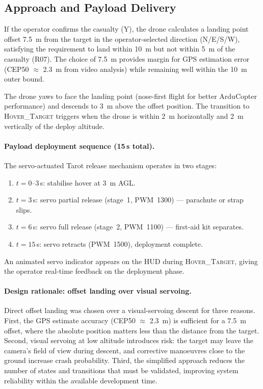 \subsection{Approach and Payload Delivery}\label{sec:mf-landing}

If the operator confirms the casualty (Y), the drone calculates a landing point offset \SI{7.5}{\metre} from the target in the operator-selected direction (N/E/S/W), satisfying the requirement to land within \SI{10}{\metre} but not within \SI{5}{\metre} of the casualty (R07).  The choice of \SI{7.5}{\metre} provides margin for GPS estimation error (CEP50 $\approx$ \SI{2.3}{\metre} from video analysis) while remaining well within the \SI{10}{\metre} outer bound.

The drone yaws to face the landing point (nose-first flight for better ArduCopter performance) and descends to \SI{3}{\metre} above the offset position.  The transition to \textsc{Hover\_Target} triggers when the drone is within \SI{2}{\metre} horizontally and \SI{2}{\metre} vertically of the deploy altitude.

\paragraph{Payload deployment sequence (15\,s total).}  The servo-actuated Tarot release mechanism operates in two stages:

\begin{enumerate}
  \item $t = 0$--$3$\,s: stabilise hover at \SI{3}{\metre} AGL.
  \item $t = 3$\,s: servo partial release (stage~1, PWM~1300) --- parachute or strap slips.
  \item $t = 6$\,s: servo full release (stage~2, PWM~1100) --- first-aid kit separates.
  \item $t = 15$\,s: servo retracts (PWM~1500), deployment complete.
\end{enumerate}

\noindent An animated servo indicator appears on the HUD during \textsc{Hover\_Target}, giving the operator real-time feedback on the deployment phase.

\paragraph{Design rationale: offset landing over visual servoing.}  Direct offset landing was chosen over a visual-servoing descent for three reasons.  First, the GPS estimate accuracy (CEP50 $\approx$ \SI{2.3}{\metre}) is sufficient for a \SI{7.5}{\metre} offset, where the absolute position matters less than the distance from the target.  Second, visual servoing at low altitude introduces risk: the target may leave the camera's field of view during descent, and corrective manoeuvres close to the ground increase crash probability.  Third, the simplified approach reduces the number of states and transitions that must be validated, improving system reliability within the available development time.

